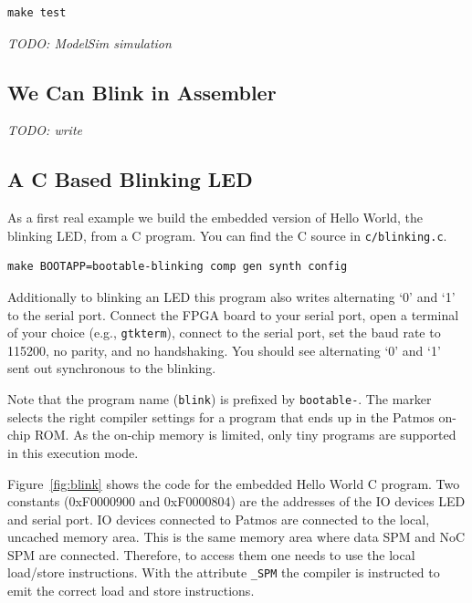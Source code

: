 \documentclass[a4paper,fontsize=10pt,twoside,DIV15,BCOR12mm,headinclude=true,footinclude=false,pagesize,bibtotoc]{scrbook}
\newcommand{\code}[1]{{\texttt{#1}}}
\newcommand{\todo}[1]{{\emph{TODO: #1}}}
\begin{document}
\begin{verbatim}
make test
\end{verbatim}


\todo{ModelSim simulation}

\subsection{We Can Blink in Assembler}

\todo{write}

\subsection{A C Based Blinking LED}

As a first real example we build the embedded version of Hello World, the
blinking LED, from a C program. You can find the C source in \code{c/blinking.c}.

\begin{verbatim}
make BOOTAPP=bootable-blinking comp gen synth config
\end{verbatim}

Additionally to blinking an LED this program also writes alternating `0' and `1'
to the serial port. Connect the FPGA board to your serial port,
open a terminal of your choice (e.g., \code{gtkterm}), connect to the serial port,
set the baud rate to 115200, no parity, and no handshaking.
You should see alternating `0' and `1' sent out synchronous to the blinking.

Note that the program name (\code{blink}) is prefixed by \code{bootable-}.
The marker selects the right compiler settings for a program that ends up in
the Patmos on-chip ROM. As the on-chip memory is limited, only tiny programs
are supported in this execution mode.

Figure~\ref{fig:blink} shows the code for the embedded Hello World
C program. Two constants (0xF0000900 and 0xF0000804) are the addresses
of the IO devices LED and serial port. IO devices connected to Patmos are
connected to the local, uncached memory area. This is the same memory
area where data SPM and NoC SPM are connected. Therefore, to access them
one needs to use the local load/store instructions. With the attribute \code{\_SPM}
the compiler is instructed to emit the correct load and store instructions.
\end{document}

